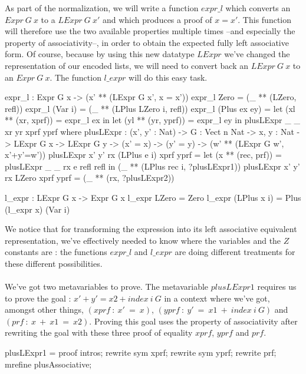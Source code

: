 \documentclass{sigplanconf}
\begin{document}
As part of the normalization, we will write a function $expr\_l$ which converts an $Expr\ G\ x$ to a $LExpr\ G\ x'$ and which produces a proof of $x=x'$. This function will therefore use the two available properties multiple times --and especially the property of associativity--, in order to obtain the expected fully left associative form. Of course, because by using this new datatype $LExpr$ we've changed the representation of our encoded lists, we will need to convert back an $LExpr\ G\ x$ to an $Expr\ G\ x$. The function $l\_expr$ will do this easy task.

\begin{code}[caption=Production of the left associative form, captionpos=b, label=lst1:haskell2]
expr_l : Expr G x 
         -> (x' ** (LExpr G x', x = x'))
expr_l Zero = (_ ** (LZero, refl))
expr_l (Var i) = (_ ** (LPlus LZero i, refl))
expr_l (Plus ex ey) = 
  let (xl ** (xr, xprf)) = expr_l ex in
  let (yl ** (yr, yprf)) = expr_l ey in
    plusLExpr _ _ xr yr xprf yprf
      where 
      plusLExpr : (x', y' : Nat)
            -> {G : Vect n Nat} -> {x, y : Nat} 
            -> LExpr G x -> LExpr G y 
            -> (x' = x) -> (y' = y) 
            -> (w' ** (LExpr G w', x'+y'=w'))
      plusLExpr x' y' rx (LPlus e i) xprf yprf =
        let (x ** (rec, prf)) = 
          plusLExpr _ _ rx e refl refl in
          (_ ** (LPlus rec i, ?plusLExpr1))
      plusLExpr x' y' rx LZero xprf yprf =
        (_ ** (rx, ?plusLExpr2))

l_expr : LExpr G x -> Expr G x
l_expr LZero = Zero
l_expr (LPlus x i) = Plus (l_expr x) (Var i)
\end{code}

We notice that for transforming the expression into its left associative equivalent representation, we've effectively needed to know where the variables and the $Z$ constants are : the functions $expr\_l$ and $l\_expr$ are doing different treatments for these different possibilities. \\
\\
We've got two metavariables to prove. The metavariable $plusLExpr1$ requires us to prove the goal : $x' + y' = x2 + index\ i\ G$ in a context where we've got, amongst other things,  $(xprf\ :\ x'\ =\ x)$, $(yprf\ :\ y'\ =\ x1\ +\ index\ i\ G)$ and $(prf\ :\ x\ +\ x1\ =\ x2)$.
Proving this goal uses the property of associativity after rewriting the goal with these three proof of equality $xprf$, $yprf$ and $prf$.

\begin{code}[caption=Proof of the metavariable plusLExpr1, captionpos=b, label=lst1:haskell2]
plusLExpr1 = proof {
  intros;
  rewrite sym xprf;
  rewrite sym yprf;
  rewrite prf;
  mrefine plusAssociative;
}
\end{code}
\end{document}
